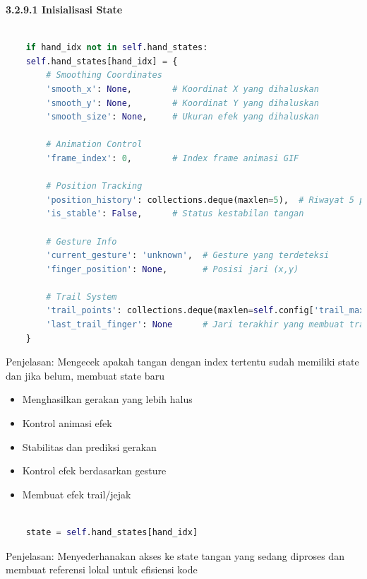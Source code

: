 \documentclass[11pt,a4paper]{article}
\begin{document}
    \noindent\textbf{3.2.9.1 Inisialisasi State}
    \begin{lstlisting}[language=Python, caption=Inisialisasi State]

    if hand_idx not in self.hand_states:    
    self.hand_states[hand_idx] = {
        # Smoothing Coordinates
        'smooth_x': None,        # Koordinat X yang dihaluskan
        'smooth_y': None,        # Koordinat Y yang dihaluskan
        'smooth_size': None,     # Ukuran efek yang dihaluskan
        
        # Animation Control
        'frame_index': 0,        # Index frame animasi GIF
        
        # Position Tracking
        'position_history': collections.deque(maxlen=5),  # Riwayat 5 posisi terakhir
        'is_stable': False,      # Status kestabilan tangan
        
        # Gesture Info
        'current_gesture': 'unknown',  # Gesture yang terdeteksi
        'finger_position': None,       # Posisi jari (x,y)
        
        # Trail System
        'trail_points': collections.deque(maxlen=self.config['trail_max_length']),  # Titik-titik trail
        'last_trail_finger': None      # Jari terakhir yang membuat trail
    }
    \end{lstlisting}
    Penjelasan: Mengecek apakah tangan dengan index tertentu sudah memiliki state dan jika belum, membuat state baru
    \begin{itemize}
        \item Menghasilkan gerakan yang lebih halus
        \item Kontrol animasi efek
        \item Stabilitas dan prediksi gerakan
        \item Kontrol efek berdasarkan gesture
        \item Membuat efek trail/jejak
    \end{itemize}

    \begin{lstlisting}[language=Python, caption=mengambil state (kondisi) tangan]
        
    state = self.hand_states[hand_idx]
    \end{lstlisting}
    Penjelasan: Menyederhanakan akses ke state tangan yang sedang diproses dan membuat referensi lokal untuk efisiensi kode
 
\end{document}
